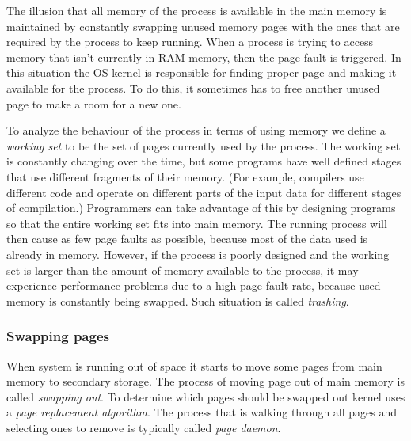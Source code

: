 The illusion that all memory of the process is available in the main memory is maintained by constantly swapping unused memory pages
with the ones that are required by the process to keep running.
When a process is trying to access memory that isn't currently in RAM memory, then the page fault is triggered.
In this situation the OS kernel is responsible for finding proper page and making it available for the process.
To do this, it sometimes has to free another unused page to make a room for a new one.

To analyze the behaviour of the process in terms of using memory we define a {\it working set} to be the set of pages currently used by the process.
The working set is constantly changing over the time, but some programs have well defined stages that use different fragments of their memory.
(For example, compilers use different code and operate on different parts of the input data for different stages of compilation.)
Programmers can take advantage of this by designing programs so that the entire working set fits into main memory.
The running process will then cause as few page faults as possible, because most of the data used is already in memory.
However, if the process is poorly designed and the working set is larger than the amount of memory available to the process,
it may experience performance problems due to a high page fault rate, because used memory is constantly being swapped.
Such situation is called {\it trashing}.


\subsubsection{Swapping pages}

When system is running out of space it starts to move some pages from main memory to secondary storage.
The process of moving page out of main memory is called {\it swapping out}.
To determine which pages should be swapped out kernel uses a {\it page replacement algorithm}.
The process that is walking through all pages and selecting ones to remove is typically called {\it page daemon}.

